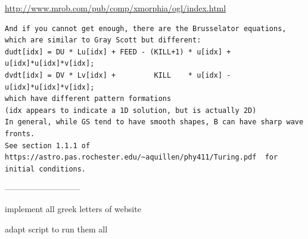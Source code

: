 \newpage




\url{
http://www.mrob.com/pub/comp/xmorphia/ogl/index.html
}


\begin{verbatim}
And if you cannot get enough, there are the Brusselator equations, which are similar to Gray Scott but different:
dudt[idx] = DU * Lu[idx] + FEED - (KILL+1) * u[idx] + u[idx]*u[idx]*v[idx];
dvdt[idx] = DV * Lv[idx] +         KILL    * u[idx] - u[idx]*u[idx]*v[idx];
which have different pattern formations
(idx appears to indicate a 1D solution, but is actually 2D)
In general, while GS tend to have smooth shapes, B can have sharp wave fronts.
See section 1.1.1 of https://astro.pas.rochester.edu/~aquillen/phy411/Turing.pdf  for initial conditions.
\end{verbatim}




---------------------------

implement all greek letters of website

adapt script to run them all



